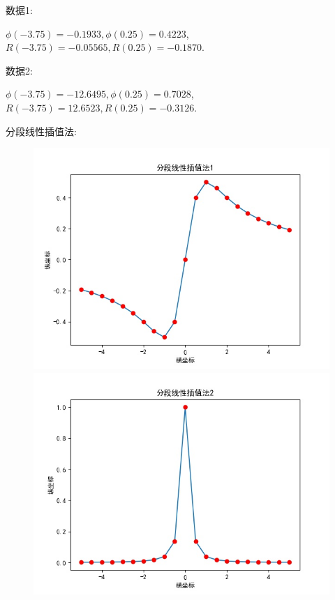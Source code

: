 \documentclass[UTF8]{ctexart}
\begin{document}
数据1:

$\phi(-3.75) = -0.1933 ,\phi(0.25) = 0.4223$,$R(-3.75)= -0.05565, R(0.25) = -0.1870$.

数据2:

$\phi(-3.75) = -12.6495 ,\phi(0.25) = 0.7028$,$R(-3.75)= 12.6523, R(0.25) = -0.3126$.

\quad

分段线性插值法:
\begin{figure}[h]
    \centering
    \begin{minipage}[t]{0.4\linewidth}
    \includegraphics[width=\linewidth]{DL1.jpg}
    \end{minipage}%
    \begin{minipage}[t]{0.4\linewidth}
    \includegraphics[width=\linewidth]{DL2.jpg}
    \end{minipage}
\end{figure}
\end{document}
